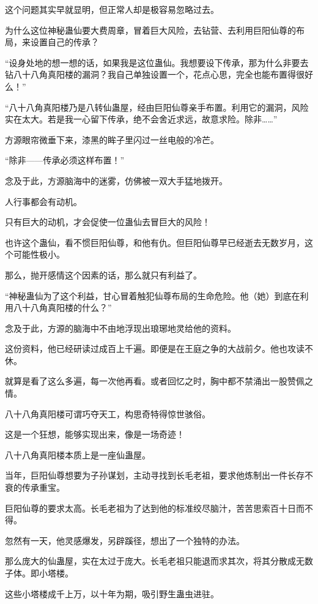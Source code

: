 
\begin{this_body}

这个问题其实早就显明，但正常人却是极容易忽略过去。

为什么这位神秘蛊仙要大费周章，冒着巨大风险，去钻营、去利用巨阳仙尊的布局，来设置自己的传承？

“设身处地的想一想的话，如果我是这位蛊仙。我想要设下传承，那为什么非要去钻八十八角真阳楼的漏洞？我自己单独设置一个，花点心思，完全也能布置得很好么！”

“八十八角真阳楼乃是八转仙蛊屋，经由巨阳仙尊亲手布置。利用它的漏洞，风险实在太大。若是我一心留下传承，绝不会舍近求远，故意求险。除非……”

方源眼帘微垂下来，漆黑的眸子里闪过一丝电般的冷芒。

“除非——传承必须这样布置！”

念及于此，方源脑海中的迷雾，仿佛被一双大手猛地拨开。

人行事都会有动机。

只有巨大的动机，才会促使一位蛊仙去冒巨大的风险！

也许这个蛊仙，看不惯巨阳仙尊，和他有仇。但巨阳仙尊早已经逝去无数岁月，这个可能性极小。

那么，抛开感情这个因素的话，那么就只有利益了。

“神秘蛊仙为了这个利益，甘心冒着触犯仙尊布局的生命危险。他（她）到底在利用八十八角真阳楼的什么？”

念及于此，方源的脑海中不由地浮现出琅琊地灵给他的资料。

这份资料，他已经研读过成百上千遍。即便是在王庭之争的大战前夕。他也攻读不休。

就算是看了这么多遍，每一次他再看。或者回忆之时，胸中都不禁涌出一股赞佩之情。

八十八角真阳楼可谓巧夺天工，构思奇特得惊世骇俗。

这是一个狂想，能够实现出来，像是一场奇迹！

八十八角真阳楼本质上是一座仙蛊屋。

当年，巨阳仙尊想要为子孙谋划，主动寻找到长毛老祖，要求他炼制出一件长存不衰的传承重宝。

巨阳仙尊的要求太高。长毛老祖为了达到他的标准绞尽脑汁，苦苦思索百十日而不得。

忽然有一天，他灵感爆发，另辟蹊径，想出了一个独特的办法。

那么庞大的仙蛊屋，实在太过于庞大。长毛老祖只能退而求其次，将其分散成无数子体。即小塔楼。

这些小塔楼成千上万，以十年为期，吸引野生蛊虫进驻。


\end{this_body}
